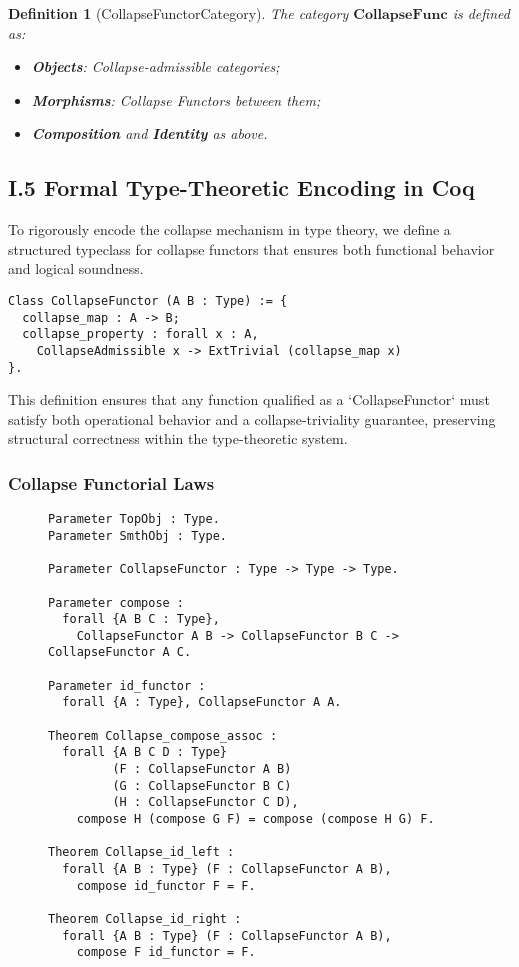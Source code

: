 \documentclass[11pt]{article}
\newtheorem{definition}[theorem]{Definition}
\begin{document}
\begin{definition}[CollapseFunctorCategory]
The category \( \mathbf{CollapseFunc} \) is defined as:

\begin{itemize}
    \item \textbf{Objects}: Collapse-admissible categories;
    \item \textbf{Morphisms}: Collapse Functors between them;
    \item \textbf{Composition} and \textbf{Identity} as above.
\end{itemize}
\end{definition}

\subsection*{I.5 Formal Type-Theoretic Encoding in Coq}

To rigorously encode the collapse mechanism in type theory, we define a structured typeclass for collapse functors that ensures both functional behavior and logical soundness.

\begin{lstlisting}[language=Coq, caption={CollapseFunctor as a Typeclass with Structural Guarantees}]
Class CollapseFunctor (A B : Type) := {
  collapse_map : A -> B;
  collapse_property : forall x : A,
    CollapseAdmissible x -> ExtTrivial (collapse_map x)
}.
\end{lstlisting}

This definition ensures that any function qualified as a `CollapseFunctor` must satisfy both operational behavior and a collapse-triviality guarantee, preserving structural correctness within the type-theoretic system.


\subsubsection*{Collapse Functorial Laws}

\begin{figure}[H]
\centering
\begin{lstlisting}[language=Coq, mathescape=false, caption={Collapse Functorial Laws in Coq}]
Parameter TopObj : Type.
Parameter SmthObj : Type.

Parameter CollapseFunctor : Type -> Type -> Type.

Parameter compose :
  forall {A B C : Type},
    CollapseFunctor A B -> CollapseFunctor B C -> CollapseFunctor A C.

Parameter id_functor :
  forall {A : Type}, CollapseFunctor A A.

Theorem Collapse_compose_assoc :
  forall {A B C D : Type}
         (F : CollapseFunctor A B)
         (G : CollapseFunctor B C)
         (H : CollapseFunctor C D),
    compose H (compose G F) = compose (compose H G) F.

Theorem Collapse_id_left :
  forall {A B : Type} (F : CollapseFunctor A B),
    compose id_functor F = F.

Theorem Collapse_id_right :
  forall {A B : Type} (F : CollapseFunctor A B),
    compose F id_functor = F.
\end{lstlisting}
\end{figure}
\end{document}
